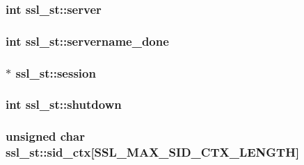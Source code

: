 \subsubsection[{\texorpdfstring{server}{server}}]{\setlength{\rightskip}{0pt plus 5cm}int ssl\+\_\+st\+::server}\hypertarget{structssl__st_a022f1e4cf3a0a68ffc4f4d80d4de8d6b}{}\label{structssl__st_a022f1e4cf3a0a68ffc4f4d80d4de8d6b}
\subsubsection[{\texorpdfstring{servername\+\_\+done}{servername_done}}]{\setlength{\rightskip}{0pt plus 5cm}int ssl\+\_\+st\+::servername\+\_\+done}\hypertarget{structssl__st_ac1ac6725cca99bc51b875fbe62ccb504}{}\label{structssl__st_ac1ac6725cca99bc51b875fbe62ccb504}
\subsubsection[{\texorpdfstring{session}{session}}]{$\ast$ ssl\+\_\+st\+::session}\hypertarget{structssl__st_ae6d956c10b03dd3f4d0a3a132466eb47}{}\label{structssl__st_ae6d956c10b03dd3f4d0a3a132466eb47}
\subsubsection[{\texorpdfstring{shutdown}{shutdown}}]{\setlength{\rightskip}{0pt plus 5cm}int ssl\+\_\+st\+::shutdown}\hypertarget{structssl__st_a12a82cfd124852a54354a46012bdd502}{}\label{structssl__st_a12a82cfd124852a54354a46012bdd502}
\subsubsection[{\texorpdfstring{sid\+\_\+ctx}{sid_ctx}}]{\setlength{\rightskip}{0pt plus 5cm}unsigned char ssl\+\_\+st\+::sid\+\_\+ctx\mbox{[}{\bf S\+S\+L\+\_\+\+M\+A\+X\+\_\+\+S\+I\+D\+\_\+\+C\+T\+X\+\_\+\+L\+E\+N\+G\+TH}\mbox{]}}\hypertarget{structssl__st_a486ddbf462473285440234c69568b9ce}{}\label{structssl__st_a486ddbf462473285440234c69568b9ce}
